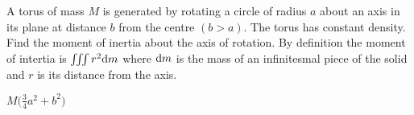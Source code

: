 \begin{question}
A torus of mass $M$ is generated by rotating a circle of radius $a$ about an axis in its plane at distance $b$ from the centre $(b>a)$. The
torus has constant density.
Find the moment of inertia about the axis of rotation.
By definition the moment of intertia is $\iiint r^2 \mathrm{d}m$ 
where $\mathrm{d}m$ is the mass of an infinitesmal piece of the solid and $r$ is 
its distance from the axis.
\end{question}

%

\begin{answer}
$M\big(\frac{3}{4}a^2+b^2\big)$
\end{answer}

